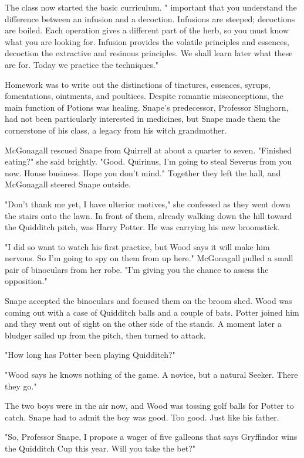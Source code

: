 The class now started the basic curriculum. "{\el} important that you understand the difference between an infusion and a decoction. Infusions are steeped; decoctions are boiled. Each operation gives a different part of the herb, so you must know what you are looking for. Infusion provides the volatile principles and essences, decoction the extractive and resinous principles. We shall learn later what these are for. Today we practice the techniques."

Homework was to write out the distinctions of tinctures, essences, syrups, fomentations, ointments, and poultices. Despite romantic misconceptions, the main function of Potions was healing. Snape's predecessor, Professor Slughorn, had not been particularly interested in medicines, but Snape made them the cornerstone of his class, a legacy from his witch grandmother.

McGonagall rescued Snape from Quirrell at about a quarter to seven. "Finished eating?" she said brightly. "Good. Quirinus, I'm going to steal Severus from you now. House business. Hope you don't mind." Together they left the hall, and McGonagall steered Snape outside.

"Don't thank me yet, I have ulterior motives," she confessed as they went down the stairs onto the lawn. In front of them, already walking down the hill toward the Quidditch pitch, was Harry Potter. He was carrying his new broomstick.

"I did so want to watch his first practice, but Wood says it will make him nervous. So I'm going to spy on them from up here." McGonagall pulled a small pair of binoculars from her robe. "I'm giving you the chance to assess the opposition."

Snape accepted the binoculars and focused them on the broom shed. Wood was coming out with a case of Quidditch balls and a couple of bats. Potter joined him and they went out of sight on the other side of the stands. A moment later a bludger sailed up from the pitch, then turned to attack.

"How long has Potter been playing Quidditch?"

"Wood says he knows nothing of the game. A novice, but a natural Seeker. There they go."

The two boys were in the air now, and Wood was tossing golf balls for Potter to catch. Snape had to admit the boy was good. Too good. Just like his father.

"So, Professor Snape, I propose a wager of five galleons that says Gryffindor wins the Quidditch Cup this year. Will you take the bet?"

